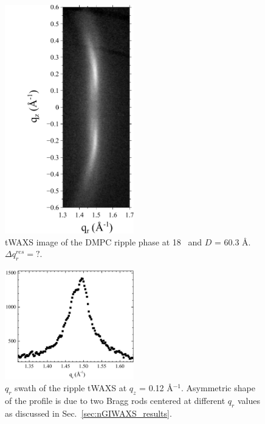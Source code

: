 \begin{figure}[htbp]
  \centering
  \includegraphics[trim=20 0 10 0,clip,width=0.5\textwidth]{figures/ripple/tWAXS/twaxs_ripple}
  \caption[tWAXS image of the DMPC ripple phase]{tWAXS image of the DMPC
  ripple phase at 18 \textcelsius\ and $D$ = 60.3 \AA. {\jn ${\Delta}q_r^{res}=?$.}}
  \label{fig:twaxs_ripple}
\end{figure}

\begin{figure}[htbp]
  \centering
  \includegraphics[width=0.5\textwidth]{figures/ripple/tWAXS/twaxs_weak_qr}
  \caption{$q_r$ swath of the ripple tWAXS at $q_z$ = 0.12 \AA$^{-1}$. 
  Asymmetric shape of the profile is due to
  two Bragg rods centered at different $q_r$ values as discussed in
  Sec.~\ref{sec:nGIWAXS_results}.}
  \label{fig:twaxs_weak_qr}
\end{figure}

